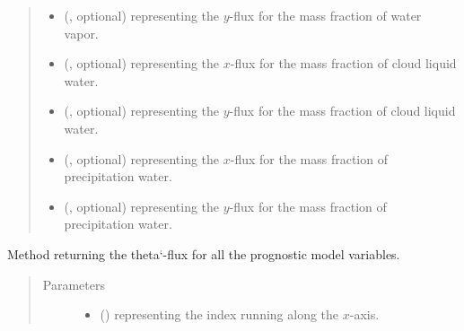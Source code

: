 \documentclass[letterpaper,10pt,english]{sphinxmanual}
\begin{document}
\begin{fulllineitems}
\begin{fulllineitems}
\begin{quote}
\begin{description}
\begin{itemize}
\item {} 
 (, optional) \textendash{}  representing the \(y\)-flux for the mass fraction of water vapor.

\item {} 
 (, optional) \textendash{}  representing the \(x\)-flux for the mass fraction of cloud liquid water.

\item {} 
 (, optional) \textendash{}  representing the \(y\)-flux for the mass fraction of cloud liquid water.

\item {} 
 (, optional) \textendash{}  representing the \(x\)-flux for the mass fraction of precipitation water.

\item {} 
 (, optional) \textendash{}  representing the \(y\)-flux for the mass fraction of precipitation water.

\end{itemize}


\end{description}\end{quote}

\end{fulllineitems}


\begin{fulllineitems}
\label{\detokenize{api:dycore.flux_isentropic_nonconservative.FluxIsentropicNonconservative.get_vertical_fluxes}}
Method returning the theta{}`-flux for all
the prognostic model variables.
\begin{quote}\begin{description}
\item[{Parameters}] \leavevmode\begin{itemize}
\item {} 
 () \textendash{}  representing the index running along the \(x\)-axis.


\end{itemize}
\end{description}
\end{quote}
\end{fulllineitems}
\end{fulllineitems}
\end{document}
